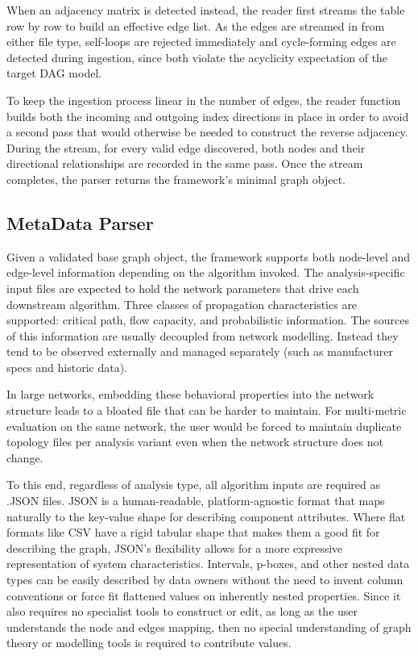\documentclass[12pt]{report}
\begin{document}
When an adjacency matrix is detected instead, the reader first streams the table row by row to build an effective edge list. As the edges are streamed in from either file type, self-loops are rejected immediately and cycle-forming edges are detected during ingestion, since both violate the acyclicity expectation of the target DAG model.

To keep the ingestion process linear in the number of edges, the reader function builds both the incoming and outgoing index directions in place in order to avoid a second pass that would otherwise be needed to construct the reverse adjacency. During the stream, for every valid edge discovered, both nodes and their directional relationships are recorded in the same pass. Once the stream completes, the parser returns the framework's minimal graph object.

\subsection{MetaData Parser}

Given a validated base graph object, the framework supports both node-level and edge-level information depending on the algorithm invoked. The analysis-specific input files are expected to hold the network parameters that drive each downstream algorithm. Three classes of propagation characteristics are supported: critical path, flow capacity, and probabilistic information. The sources of this information are usually decoupled from network modelling. Instead they tend to be observed externally and managed separately (such as manufacturer specs and historic data).

In large networks, embedding these behavioral properties into the network structure leads to a bloated file that can be harder to maintain. For multi-metric evaluation on the same network, the user would be forced to maintain duplicate topology files per analysis variant even when the network structure does not change.

To this end, regardless of analysis type, all algorithm inputs are required as .JSON files. JSON is a human-readable, platform-agnostic format that maps naturally to the key-value shape for describing component attributes. Where flat formats like CSV have a rigid tabular shape that makes them a good fit for describing the graph, JSON's flexibility allows for a more expressive representation of system characteristics. Intervals, p-boxes, and other nested data types can be easily described by data owners without the need to invent column conventions or force fit flattened values on inherently nested properties. Since it also requires no specialist tools to construct or edit, as long as the user understands the node and edges mapping, then no special understanding of graph theory or modelling tools is required to contribute values.
\end{document}
